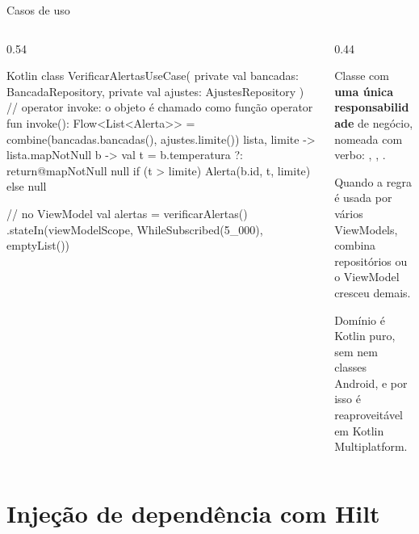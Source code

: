 \documentclass[aspectratio=169,10pt]{beamer}
\begin{document}
\begin{frame}[fragile]{Casos de uso}
  \begin{columns}[T]
    \begin{column}{0.54\textwidth}
\begin{codigo}[title=VerificarAlertasUseCase.kt]{Kotlin}
class VerificarAlertasUseCase(
  private val bancadas: BancadaRepository,
  private val ajustes: AjustesRepository
) {
  // operator invoke: o objeto é chamado como função
  operator fun invoke(): Flow<List<Alerta>> =
    combine(bancadas.bancadas(), ajustes.limite()) {
      lista, limite ->
      lista.mapNotNull { b ->
        val t = b.temperatura ?: return@mapNotNull null
        if (t > limite) Alerta(b.id, t, limite) else null
      }
    }
}

// no ViewModel
val alertas = verificarAlertas()
  .stateIn(viewModelScope, WhileSubscribed(5_000),
    emptyList())
\end{codigo}
    \end{column}
    \begin{column}{0.44\textwidth}
      \begin{conceito}
        Classe com \textbf{uma única responsabilidade} de negócio, nomeada com verbo: , , .
      \end{conceito}
      \begin{dica}
        Quando a regra é usada por vários ViewModels, combina repositórios ou o ViewModel cresceu demais.
      \end{dica}
      \begin{atencao}
        Domínio é Kotlin puro, sem  nem classes Android, e por isso é reaproveitável em Kotlin Multiplatform.
      \end{atencao}
    \end{column}
  \end{columns}
\end{frame}

\section{Injeção de dependência com Hilt}
\end{document}

